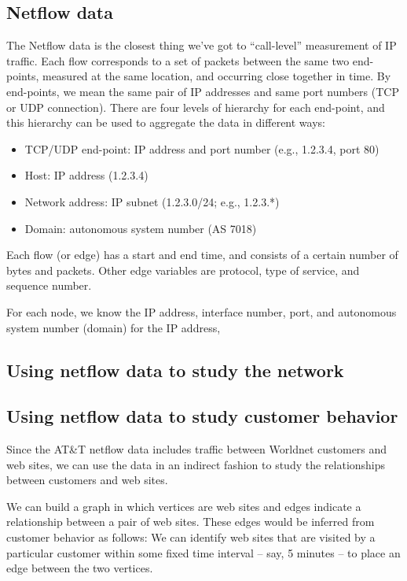 \documentclass[11pt]{article}
\begin{document}
\subsection {Netflow data}

The Netflow data is the closest thing we've got to ``call-level''
measurement of IP traffic.  Each flow corresponds to a set of packets
between the same two end-points, measured at the same location, and
occurring close together in time.  By end-points, we mean the same pair
of IP addresses and same port numbers (TCP or UDP connection).  There 
are four levels of hierarchy for each end-point, and this hierarchy
can be used to aggregate the data in different ways:

\begin{itemize} \itemsep 0em
  \item TCP/UDP end-point: IP address and port number (e.g., 1.2.3.4, port 80)
  \item Host: IP address (1.2.3.4)
  \item Network address: IP subnet (1.2.3.0/24; e.g., 1.2.3.*)
  \item Domain: autonomous system number (AS 7018)
\end{itemize}

Each flow (or edge) has a start and end time, and consists
of a certain number of bytes and packets.  Other edge
variables are protocol, type of service, and sequence number.

For each node, we know the IP address, interface number, port,
and autonomous system number (domain) for the IP address,

\subsection {Using netflow data to study the network}


\subsection {Using netflow data to study customer behavior}

Since the AT\&T netflow data includes traffic between Worldnet
customers and web sites, we can use the data in an indirect
fashion to study the relationships between customers and web
sites.

We can build a graph in which vertices are web sites and edges
indicate a relationship between a pair of web sites.  These edges
would be inferred from customer behavior as follows:  We can
identify web sites that are visited by a particular customer
within some fixed time interval -- say, 5 minutes -- to place
an edge between the two vertices.
\end{document}
